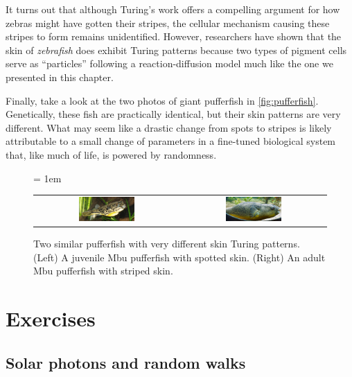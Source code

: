 It turns out that although Turing's work offers a compelling argument for how zebras might have gotten their stripes, the cellular mechanism causing these stripes to form remains unidentified. However, researchers have shown that the skin of \textit{zebrafish} does exhibit Turing patterns because two types of pigment cells serve as ``particles'' following a reaction-diffusion model much like the one we presented in this chapter.

Finally, take a look at the two photos of giant pufferfish in \autoref{fig:pufferfish}. Genetically, these fish are practically identical, but their skin patterns are very different. What may seem like a drastic change from spots to stripes is likely attributable to a small change of parameters in a fine-tuned biological system that, like much of life, is powered by randomness.\\

\begin{figure}[h]
\centering
\mySfFamily
\tabcolsep = 1em
\begin{tabular}{c c}
\includegraphics[width = 0.4\textwidth]{../images/Juvenile_Mbu_pufferfish.jpg} & \includegraphics[width = 0.4\textwidth]{../images/Giant_Puffer_fish_skin_pattern.jpg}
\end{tabular}
\caption{Two similar pufferfish with very different skin Turing patterns. (Left) A juvenile Mbu pufferfish with spotted skin. (Right) An adult Mbu pufferfish with striped skin.}
\label{fig:pufferfish}
\end{figure}

\FloatBarrier
{}
\newpage
\section{Exercises}

\subsection{Solar photons and random walks}

